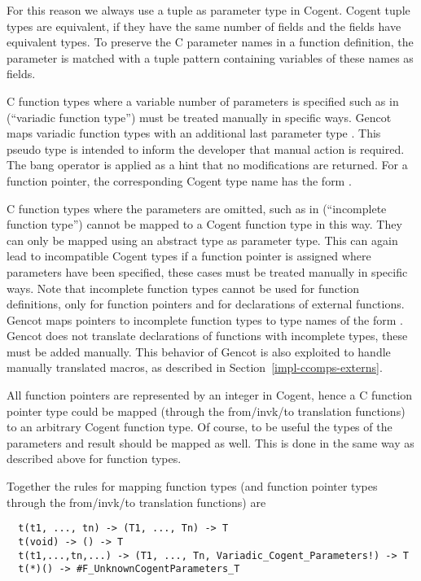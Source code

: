 For this reason we always use a tuple as parameter type in Cogent. Cogent tuple types are equivalent, if they
have the same number of fields and the fields have equivalent types. To preserve the C parameter names in 
a function definition, the parameter is matched with a tuple pattern containing variables of these
names as fields.

C function types where a variable number of
parameters is specified such as in  (``variadic function type'') must 
be treated manually in specific ways. Gencot maps variadic function types
with an additional last parameter type . This pseudo type is intended 
to inform the developer that manual action is required. The bang operator is applied as a hint
that no modifications are returned. For a function pointer, the corresponding Cogent type name has
the form .

C function types where the parameters are omitted, such as in  (``incomplete function type'') 
cannot be mapped to a Cogent function type in this way. 
They can only be mapped using an abstract type as parameter type. This can again lead to incompatible 
Cogent types if a function pointer is assigned where parameters have been specified, these cases must 
be treated manually in specific ways. Note that incomplete function types cannot be used for function
definitions, only for function pointers and for declarations of external functions. Gencot maps pointers 
to incomplete function types to type names of the form . 
Gencot does not translate declarations of functions with incomplete types, these must be added manually.
This behavior of Gencot is also exploited to handle manually translated macros, as described in 
Section~\ref{impl-ccomps-externs}.

All function pointers are represented by an integer in Cogent, hence a C function pointer type could be 
mapped (through the from/invk/to translation functions) to an arbitrary Cogent function type.
Of course, to be useful the types of the parameters and result should be mapped as well. This is done
in the same way as described above for function types.

Together the rules for mapping function types (and function pointer types through the from/invk/to translation 
functions) are
\begin{verbatim}
  t(t1, ..., tn) -> (T1, ..., Tn) -> T
  t(void) -> () -> T
  t(t1,...,tn,...) -> (T1, ..., Tn, Variadic_Cogent_Parameters!) -> T
  t(*)() -> #F_UnknownCogentParameters_T
\end{verbatim}

